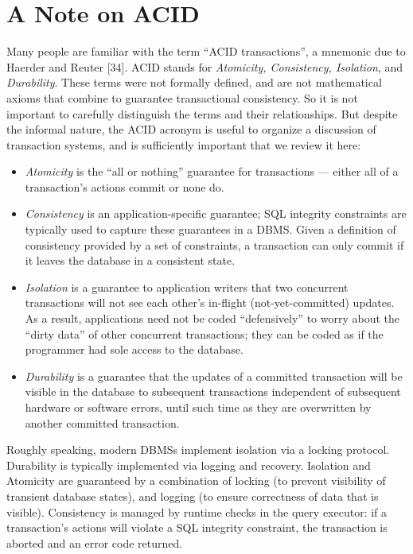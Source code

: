 \documentclass[b5paper,11pt,twoside,openright]{book}
\begin{document}
\hypertarget{a-note-on-acid}{%
\section{A Note on ACID}\label{a-note-on-acid}}

Many people are familiar with the term ``ACID transactions'', a mnemonic
due to Haerder and Reuter {[}34{]}. ACID stands for \emph{Atomicity,
Consistency, Isolation}, and \emph{Durability}. These terms were not
formally defined, and are not mathematical axioms that combine to
guarantee transactional consistency. So it is not important to
carefully distinguish the terms and their relationships. But despite
the informal nature, the ACID acronym is useful to organize a discussion
of transaction systems, and is sufficiently important that we review it
here:

\begin{itemize}
\item
  \emph{Atomicity} is the ``all or nothing'' guarantee for transactions
  --- either all of a transaction's actions commit or none do.
\item
  \emph{Consistency} is an application-specific guarantee; SQL integrity
  constraints are typically used to capture these guarantees in a DBMS.
  Given a definition of consistency provided by a set of constraints, a
  transaction can only commit if it leaves the database in a consistent
  state.
\item
  \emph{Isolation} is a guarantee to application writers that two
  concurrent transactions will not see each other's in-flight
  (not-yet-committed) updates. As a result, applications need not be
  coded ``defensively'' to worry about the ``dirty data'' of other
  concurrent transactions; they can be coded as if the programmer had
  sole access to the database.

\item
  \emph{Durability} is a guarantee that the updates of a committed
  transaction will be visible in the database to subsequent
  transactions independent of subsequent hardware or software errors,
  until such time as they are overwritten by another committed
  transaction.
\end{itemize}

Roughly speaking, modern DBMSs implement isolation via a locking
protocol. Durability is typically implemented via logging and recovery.
Isolation and Atomicity are guaranteed by a combination of locking (to
prevent visibility of transient database states), and logging (to ensure
correctness of data that is visible). Consistency is managed by runtime
checks in the query executor: if a transaction's actions will violate a
SQL integrity constraint, the transaction is aborted and an error code
returned.
\end{document}
